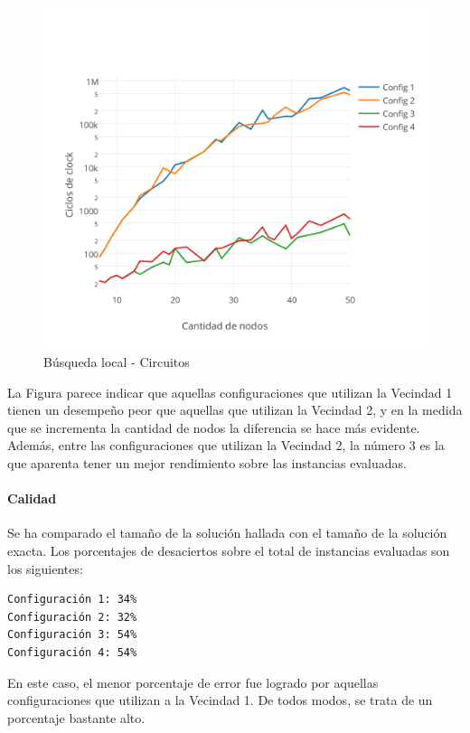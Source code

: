 \begin{figure}[htb]
	\begin{center}
    		\includegraphics[scale=0.8]{imagenes/busqlocal-circuitos-tiempo.png}
	\end{center}
	\caption{Búsqueda local - Circuitos}\label{fig:3A}
\end{figure}

La Figura parece indicar que aquellas configuraciones que utilizan la Vecindad 1  tienen un desempeño peor que aquellas que utilizan la Vecindad 2, y en la medida que se incrementa la cantidad de nodos la diferencia se hace más evidente. Además, entre las configuraciones que utilizan la Vecindad 2, la número 3 es la que aparenta tener un mejor rendimiento sobre las instancias evaluadas.

\paragraph{Calidad} Se ha comparado el tamaño de la solución hallada con el tamaño de la solución exacta.  Los porcentajes de desaciertos sobre el total de instancias evaluadas son los siguientes:

\begin{verbatim}
Configuración 1: 34%
Configuración 2: 32%
Configuración 3: 54%
Configuración 4: 54%
\end{verbatim}

En este caso, el menor porcentaje de error fue logrado por aquellas configuraciones que utilizan a la Vecindad 1.  De todos modos, se trata de un porcentaje bastante alto.

